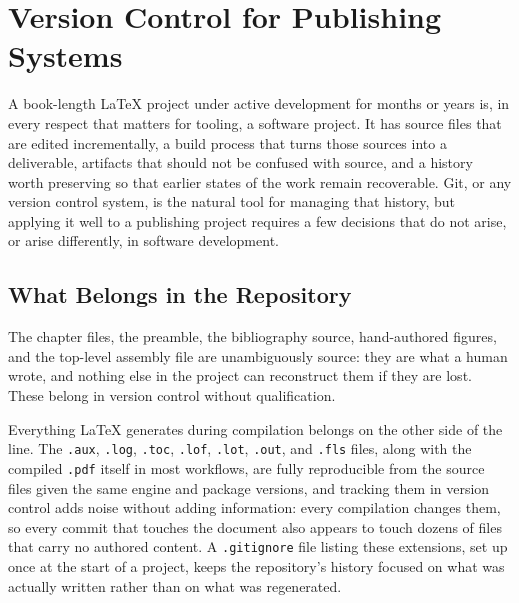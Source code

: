 \hypertarget{chapter-4-version-control-for-publishing-systems}{%
\chapter{Version Control for Publishing Systems}\label{chapter-4-version-control-for-publishing-systems}}

A book-length LaTeX project under active development for months or years is, in every respect that matters for tooling, a software project. It has source files that are edited incrementally, a build process that turns those sources into a deliverable, artifacts that should not be confused with source, and a history worth preserving so that earlier states of the work remain recoverable. Git, or any version control system, is the natural tool for managing that history, but applying it well to a publishing project requires a few decisions that do not arise, or arise differently, in software development.

\hypertarget{what-belongs-in-the-repository}{%
\section{What Belongs in the Repository}\label{what-belongs-in-the-repository}}

The chapter files, the preamble, the bibliography source, hand-authored figures, and the top-level assembly file are unambiguously source: they are what a human wrote, and nothing else in the project can reconstruct them if they are lost. These belong in version control without qualification.

Everything LaTeX generates during compilation belongs on the other side of the line. The \texttt{.aux}, \texttt{.log}, \texttt{.toc}, \texttt{.lof}, \texttt{.lot}, \texttt{.out}, and \texttt{.fls} files, along with the compiled \texttt{.pdf} itself in most workflows, are fully reproducible from the source files given the same engine and package versions, and tracking them in version control adds noise without adding information: every compilation changes them, so every commit that touches the document also appears to touch dozens of files that carry no authored content. A \texttt{.gitignore} file listing these extensions, set up once at the start of a project, keeps the repository's history focused on what was actually written rather than on what was regenerated.

